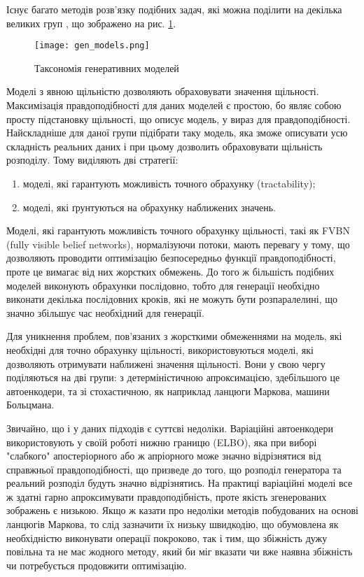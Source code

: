 Існує багато методів розв'язку подібних задач, які можна поділити
на декілька великих груп \cite{goodfellow2016nips},
що зображено на рис. \ref{fig:gen_models}.

\begin{figure}[!ht]
    \centering
    \texttt{[image: gen\_models.png]}
    \caption{Таксономія генеративних моделей}
    \label{fig:gen_models}
\end{figure}

Моделі з явною щільністю дозволяють обраховувати значення щільності.
Максимізація правдоподібності для даних моделей є простою,
бо являє собою просту підстановку щільності, що описує модель,
у вираз для правдоподібності. Найскладніше для даної групи
підібрати таку модель, яка зможе описувати усю складність реальних даних
і при цьому дозволить обраховувати щільність розподілу.
Тому виділяють дві стратегії:
\begin{enumerate}
    \item моделі, які гарантують можливість точного обрахунку (tractability);
    \item моделі, які ґрунтуються на обрахунку наближених значень.
\end{enumerate}

Моделі, які гарантують можливість точного обрахунку щільності, такі як
FVBN (fully visible belief networks), нормалізуючи потоки, мають перевагу у тому,
що дозволяють проводити оптимізацію безпосередньо функції
правдоподібності, проте це вимагає від них жорстких обмежень.
До того ж більшість подібних моделей виконують обрахунки послідовно,
тобто для генерації необхідно виконати декілька послідовних кроків, які
не можуть бути розпаралелині, що значно збільшує час необхідний для
генерації.

Для уникнення проблем, пов'язаних з жорсткими обмеженнями на
модель, які необхідні для точно обрахунку щільності, використовуються
моделі, які дозволяють отримувати наближені значення щільності.
Вони у свою чергу поділяються на дві групи: з детерміністичною
апроксимацією, здебільшого це автоенкодери, та зі стохастичною,
як наприклад ланцюги Маркова, машини Больцмана.

Звичайно, що і у даних підходів є суттєві недоліки.
Варіаційні автоенкодери використовують у своїй роботі
нижню границю (ELBO), яка при виборі "слабкого" апостеріорного
або ж апріорного може значно відрізнятися від справжньої
правдоподібності, що призведе до того, що розподіл генератора
та реальний розподіл будуть значно відрізнятись. На практиці
варіаційні моделі все ж здатні гарно апроксимувати правдоподібність,
проте якість згенерованих зображень є низькою. Якщо ж казати про
недоліки методів побудованих на основі ланцюгів Маркова, то
слід зазначити їх низьку швидкодію, що обумовлена як необхідністю
виконувати операції покроково, так і тим, що збіжність
дужу повільна та не має жодного методу, який би міг вказати
чи вже наявна збіжність чи потребується продовжити оптимізацію.

